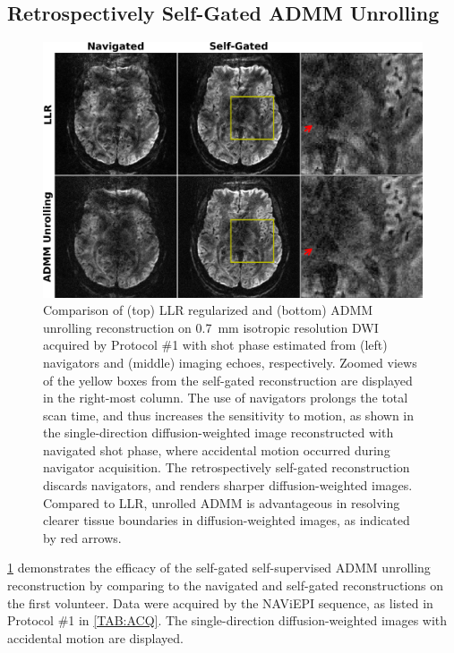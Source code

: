 \documentclass[AMA,STIX2COL,Linenumberson]{MRM}
\begin{document}
\subsection{Retrospectively Self-Gated ADMM Unrolling}

\begin{figure}
    \includegraphics[width=\textwidth]{./figures/fig4.png}
    \caption{Comparison of (top) LLR regularized
            and (bottom) ADMM unrolling
            reconstruction on 0.7~mm isotropic resolution DWI
            acquired by Protocol \#1
            with shot phase estimated from
            (left) navigators and (middle) imaging echoes, respectively.
            Zoomed views of the yellow boxes from the self-gated reconstruction
            are displayed in the right-most column.
            The use of navigators prolongs the total scan time,
            and thus increases the sensitivity to motion,
            as shown in the single-direction diffusion-weighted image
            reconstructed with navigated shot phase,
            where accidental motion occurred during navigator acquisition.
            The retrospectively self-gated reconstruction discards navigators,
            and renders sharper diffusion-weighted images.
            Compared to LLR, unrolled ADMM is advantageous
            in resolving clearer tissue boundaries
            in diffusion-weighted images,
            as indicated by red arrows.}
            \label{FIG:MOTION_RETRO_TRA}
\end{figure}

\cref{FIG:MOTION_RETRO_TRA} demonstrates
the efficacy of the self-gated self-supervised ADMM unrolling reconstruction
by comparing to the navigated and self-gated reconstructions
on the first volunteer.
Data were acquired by the NAViEPI sequence,
as listed in Protocol \#1 in \cref{TAB:ACQ}.
The single-direction diffusion-weighted images with accidental motion
are displayed.
\end{document}
